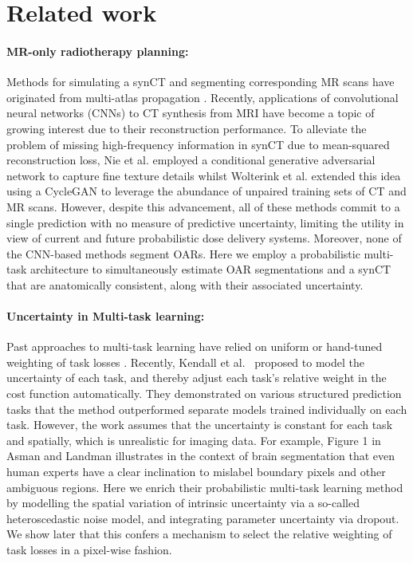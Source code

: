 \section{Related work}
\paragraph{MR-only radiotherapy planning:} Methods for simulating a synCT and segmenting corresponding MR scans have originated from multi-atlas propagation \cite{ninon2017}. Recently, applications of convolutional neural networks (CNNs) to CT synthesis from MRI have become a topic of growing interest due to their reconstruction performance. To alleviate the problem of missing high-frequency information in synCT due to mean-squared reconstruction loss, Nie et al. \cite{nie2017} employed a conditional generative adversarial network to capture fine texture details whilst Wolterink et al. \cite{wolterink2017} extended this idea using a CycleGAN to leverage the abundance of unpaired training sets of CT and MR scans. However, despite this advancement, all of these methods commit to a single prediction with no measure of predictive uncertainty, limiting the utility in view of current and future probabilistic dose delivery systems. Moreover, none of the CNN-based methods segment OARs. Here we employ a probabilistic multi-task architecture to simultaneously estimate OAR segmentations and a synCT that are anatomically consistent, along with their associated uncertainty. 


\paragraph{Uncertainty in Multi-task learning:}
Past approaches to multi-task learning have relied on uniform or hand-tuned weighting of task losses \cite{moeskops2016deep,tanno2018autodvt}. Recently, Kendall et al.~\cite{kendall2017multi} proposed to model the uncertainty of each task, and thereby adjust each task’s relative weight in the cost function automatically. They demonstrated on various structured prediction tasks that the method outperformed separate models trained individually on each task. However, the work assumes that the uncertainty is constant for each task and spatially, which is unrealistic for imaging data. For example, Figure 1 in Asman and Landman \cite{asman2011robust} illustrates in the context of brain segmentation that even human experts have a clear inclination to mislabel boundary pixels and other ambiguous regions. Here we enrich their probabilistic multi-task learning method by modelling the spatial variation of intrinsic uncertainty via a so-called heteroscedastic noise model, and integrating parameter uncertainty via dropout. We show later that this confers a mechanism to select the relative weighting of task losses in a pixel-wise fashion. 

